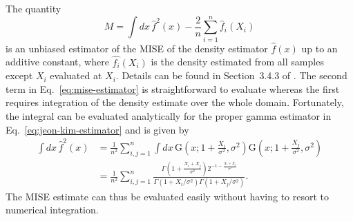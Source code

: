 \label{app:cross-validation}The quantity 
\begin{equation}
M=\int dx\,\hat{f}^{2}\left(x\right)-\frac{2}{n}\sum_{i=1}^{n}\hat{f}_{i}\left(X_{i}\right)\label{eq:mise-estimator}
\end{equation}
is an unbiased estimator of the MISE of the density estimator $\hat{f}\left(x\right)$ up to an additive constant, where $\hat{f_{i}}\left(X_{i}\right)$ is the density estimated from all samples except $X_{i}$ evaluated at $X_{i}$. Details can be found in Section~3.4.3 of \citet{Silverman1986}. The second term in Eq.~\eqref{eq:mise-estimator} is straightforward to evaluate whereas the first requires integration of the density estimate over the whole domain. Fortunately, the integral can be evaluated analytically for the proper gamma estimator in Eq.~\eqref{eq:jeon-kim-estimator} and is given by
\begin{align*}
\int dx\,\hat{f}^{2}\left(x\right) & =\frac{1}{n^{2}}\sum_{i,j=1}^{n}\int dx\,\mathrm{G}\left(x;1+\frac{X_{i}}{\sigma^{2}},\sigma^{2}\right)\mathrm{G}\left(x;1+\frac{X_{j}}{\sigma^{2}},\sigma^{2}\right)\\
 & =\frac{1}{n^{2}}\sum_{i,j=1}^{n}\frac{\Gamma\left(1+\frac{X_{i}+X_{j}}{\sigma^{2}}\right)2^{-1-\frac{X_{i}+X_{j}}{\sigma^{2}}}}{\Gamma\left(1+X_{i}/\sigma^{2}\right)\Gamma\left(1+X_{j}/\sigma^{2}\right)}.
\end{align*}
The MISE estimate can thus be evaluated easily without having to resort to numerical integration.




